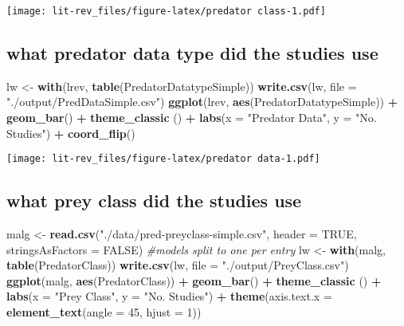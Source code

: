 \documentclass[
]{article}
\newenvironment{Shaded}{\begin{snugshade}}{\end{snugshade}}
\newcommand{\CommentTok}[1]{\textcolor[rgb]{0.56,0.35,0.01}{\textit{#1}}}
\newcommand{\DataTypeTok}[1]{\textcolor[rgb]{0.13,0.29,0.53}{#1}}
\newcommand{\DecValTok}[1]{\textcolor[rgb]{0.00,0.00,0.81}{#1}}
\newcommand{\KeywordTok}[1]{\textcolor[rgb]{0.13,0.29,0.53}{\textbf{#1}}}
\newcommand{\NormalTok}[1]{#1}
\newcommand{\OperatorTok}[1]{\textcolor[rgb]{0.81,0.36,0.00}{\textbf{#1}}}
\newcommand{\OtherTok}[1]{\textcolor[rgb]{0.56,0.35,0.01}{#1}}
\newcommand{\StringTok}[1]{\textcolor[rgb]{0.31,0.60,0.02}{#1}}
\begin{document}
\texttt{[image: lit-rev\_files/figure-latex/predator class-1.pdf]}

\hypertarget{what-predator-data-type-did-the-studies-use}{%
\subsection{what predator data type did the studies
use}\label{what-predator-data-type-did-the-studies-use}}

\begin{Shaded}
\begin{Highlighting}[]
\NormalTok{lw <-}\StringTok{ }\KeywordTok{with}\NormalTok{(lrev, }\KeywordTok{table}\NormalTok{(PredatorDatatypeSimple))}
\KeywordTok{write.csv}\NormalTok{(lw, }\DataTypeTok{file =} \StringTok{"./output/PredDataSimple.csv"}\NormalTok{)}
\KeywordTok{ggplot}\NormalTok{(lrev, }\KeywordTok{aes}\NormalTok{(PredatorDatatypeSimple)) }\OperatorTok{+}\StringTok{ }\KeywordTok{geom_bar}\NormalTok{() }\OperatorTok{+}\StringTok{ }\KeywordTok{theme_classic}\NormalTok{ () }\OperatorTok{+}\StringTok{ }\KeywordTok{labs}\NormalTok{(}\DataTypeTok{x =} \StringTok{"Predator Data"}\NormalTok{, }\DataTypeTok{y =} \StringTok{"No. Studies"}\NormalTok{) }\OperatorTok{+}\StringTok{ }\KeywordTok{coord_flip}\NormalTok{()}
\end{Highlighting}
\end{Shaded}

\texttt{[image: lit-rev\_files/figure-latex/predator data-1.pdf]}

\hypertarget{what-prey-class-did-the-studies-use}{%
\subsection{what prey class did the studies
use}\label{what-prey-class-did-the-studies-use}}

\begin{Shaded}
\begin{Highlighting}[]
\NormalTok{malg <-}\StringTok{ }\KeywordTok{read.csv}\NormalTok{(}\StringTok{"./data/pred-preyclass-simple.csv"}\NormalTok{, }\DataTypeTok{header =} \OtherTok{TRUE}\NormalTok{, }\DataTypeTok{stringsAsFactors =} \OtherTok{FALSE}\NormalTok{) }\CommentTok{#models split to one per entry}
\NormalTok{lw <-}\StringTok{ }\KeywordTok{with}\NormalTok{(malg, }\KeywordTok{table}\NormalTok{(PredatorClass))}
\KeywordTok{write.csv}\NormalTok{(lw, }\DataTypeTok{file =} \StringTok{"./output/PreyClass.csv"}\NormalTok{)}
\KeywordTok{ggplot}\NormalTok{(malg, }\KeywordTok{aes}\NormalTok{(PredatorClass)) }\OperatorTok{+}\StringTok{ }\KeywordTok{geom_bar}\NormalTok{() }\OperatorTok{+}\StringTok{ }\KeywordTok{theme_classic}\NormalTok{ () }\OperatorTok{+}\StringTok{ }\KeywordTok{labs}\NormalTok{(}\DataTypeTok{x =} \StringTok{"Prey Class"}\NormalTok{, }\DataTypeTok{y =} \StringTok{"No. Studies"}\NormalTok{) }\OperatorTok{+}\StringTok{ }\KeywordTok{theme}\NormalTok{(}\DataTypeTok{axis.text.x =} \KeywordTok{element_text}\NormalTok{(}\DataTypeTok{angle =} \DecValTok{45}\NormalTok{, }\DataTypeTok{hjust =} \DecValTok{1}\NormalTok{))}
\end{Highlighting}
\end{Shaded}
\end{document}
